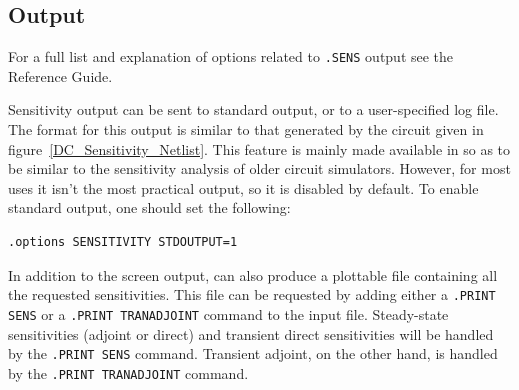 \clearpage
\subsection{Output}
\label{SENS_Output}
For a full list and explanation of options related to \texttt{.SENS} output see 
the \Xyce{} Reference Guide\ReferenceGuide{}.

Sensitivity output can be sent to standard output, or to a user-specified
log file.  The format for this output is similar to that generated by the circuit
given in figure~\ref{DC_Sensitivity_Netlist}.
This feature is mainly made available in \Xyce{} so as to be similar to 
the sensitivity analysis of older circuit simulators.   However, for most uses 
it isn't the most practical output, so it is disabled by default.   To enable standard
output, one should set the following: 
\begin{verbatim}
.options SENSITIVITY STDOUTPUT=1
\end{verbatim}

In addition to the screen output, \Xyce{} can also produce a plottable file containing
all the requested sensitivities.  This file can be requested by adding either a \texttt{.PRINT SENS} 
or a \texttt{.PRINT TRANADJOINT} command to the input file.  Steady-state 
sensitivities (adjoint or direct) and transient direct sensitivities will be 
handled by the \texttt{.PRINT SENS} command.  Transient adjoint, on the other 
hand, is handled by the \texttt{.PRINT TRANADJOINT} command.

